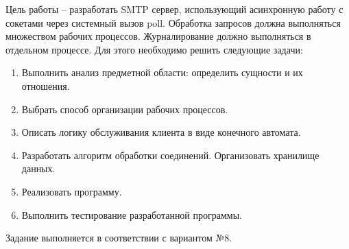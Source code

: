 \Introduction

Цель работы -- разработать SMTP сервер, использующий асинхронную работу с сокетами через системный вызов poll.
Обработка запросов должна выполняться множеством рабочих процессов.
Журналирование должно выполняться в отдельном процессе.
Для этого необходимо решить следующие задачи:
\begin{enumerate}
\item Выполнить анализ предметной области: определить сущности и их отношения.
\item Выбрать способ организации рабочих процессов.
\item Описать логику обслуживания клиента в виде конечного автомата.
\item Разработать алгоритм обработки соединений. Организовать хранилище данных.
\item Реализовать программу.
\item Выполнить тестирование разработанной программы.
\end{enumerate}

Задание выполняется в соответствии с вариантом №8.
